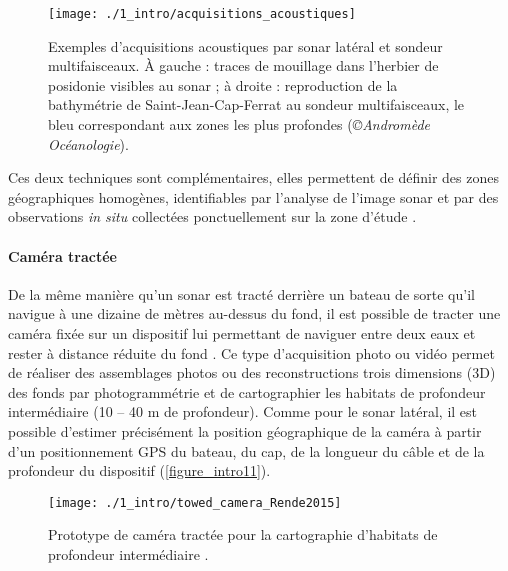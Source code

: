 \begin{figure}[H]
	\begin{center}
	\texttt{[image: ./1\_intro/acquisitions\_acoustiques]}
		\caption[Exemples d’acquisitions acoustiques par sonar latéral et sondeur multifaisceaux]{Exemples d’acquisitions acoustiques par sonar latéral et sondeur multifaisceaux. À gauche : traces de mouillage dans l’herbier de posidonie visibles au sonar ; à droite : reproduction de la bathymétrie de Saint-Jean-Cap-Ferrat au sondeur multifaisceaux, le bleu correspondant aux zones les plus profondes (\textit{©Andromède Océanologie}).}
	\label{figure_intro10}
\end{center}
\end{figure}

Ces deux techniques sont complémentaires, elles permettent de définir des zones géographiques homogènes, identifiables par l’analyse de l’image sonar et par des observations \textit{in situ} collectées ponctuellement sur la zone d’étude \citep{brown_benthic_2011}. 

\paragraph{Caméra tractée}

De la même manière qu’un sonar est tracté derrière un bateau de sorte qu’il navigue à une dizaine de mètres au-dessus du fond, il est possible de tracter une caméra fixée sur un dispositif lui permettant de naviguer entre deux eaux et rester à distance réduite du fond \citep{rende_advances_2015}. Ce type d’acquisition photo ou vidéo permet de réaliser des assemblages photos ou des reconstructions trois dimensions (3D) des fonds par photogrammétrie et de cartographier les habitats de profondeur intermédiaire (10 – 40 m de profondeur). Comme pour le sonar latéral, il est possible d’estimer précisément la position géographique de la caméra à partir d’un positionnement GPS du bateau, du cap, de la longueur du câble et de la profondeur du dispositif (\autoref{figure_intro11}).

\begin{figure}[H]
	\begin{center}
	\texttt{[image: ./1\_intro/towed\_camera\_Rende2015]}
		\caption[Prototype de caméra tractée pour la cartographie d’habitats de profondeur intermédiaire]{Prototype de caméra tractée pour la cartographie d’habitats de profondeur intermédiaire \citep{rende_advances_2015}.}
	\label{figure_intro11}
\end{center}
\end{figure}


